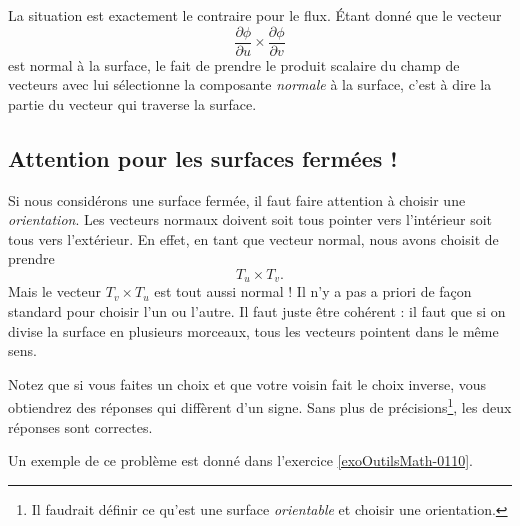 La situation est exactement le contraire pour le flux. Étant donné que le vecteur
\begin{equation}
    \frac{ \partial \phi }{ \partial u }\times\frac{ \partial \phi }{ \partial v }
\end{equation}
est normal à la surface, le fait de prendre le produit scalaire du champ de vecteurs avec lui sélectionne la composante \emph{normale} à la surface, c'est à dire la partie du vecteur qui traverse la surface.

\subsection{Attention pour les surfaces fermées !}

Si nous considérons une surface fermée, il faut faire attention à choisir une \emph{orientation}. Les vecteurs normaux doivent soit tous pointer vers l'intérieur soit tous vers l'extérieur. En effet, en tant que vecteur normal, nous avons choisit de prendre
\begin{equation}
    T_u\times T_v.
\end{equation}
Mais le vecteur $T_v\times T_u$ est tout aussi normal ! Il n'y a pas a priori de façon standard pour choisir l'un ou l'autre. Il faut juste être cohérent : il faut que si on divise la surface en plusieurs morceaux, tous les vecteurs pointent dans le même sens.

Notez que si vous faites un choix et que votre voisin fait le choix inverse, vous obtiendrez des réponses qui diffèrent d'un signe. Sans plus de précisions\footnote{Il faudrait définir ce qu'est une surface \emph{orientable} et choisir une orientation.}, les deux réponses sont correctes.

Un exemple de ce problème est donné dans l'exercice \ref{exoOutilsMath-0110}.
